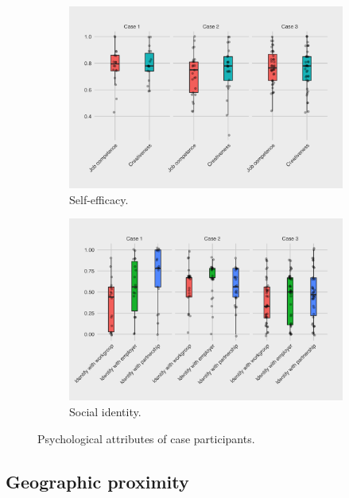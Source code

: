 \begin{landscape}
\begin{figure}[hbt!]
\begin{subfigure}[b]{0.7\textwidth}
\includegraphics[width=\textwidth]{Images/efficacy_case.png}
\caption[]%
{{\small Self-efficacy.}}    
\label{fig:efficacy}
\end{subfigure}
\hfill
\begin{subfigure}[b]{0.7\textwidth}   
\centering 
\includegraphics[width=\textwidth]{Images/identification_case.png}
\caption[]%
{{\small Social identity.}}    
\label{fig:identification}
\end{subfigure}
\caption[Psychological attributes of case participants]
{\small {Psychological attributes of case participants.}} 
\label{fig:psycho}
\end{figure}
\end{landscape}

\subsection{Geographic proximity}

